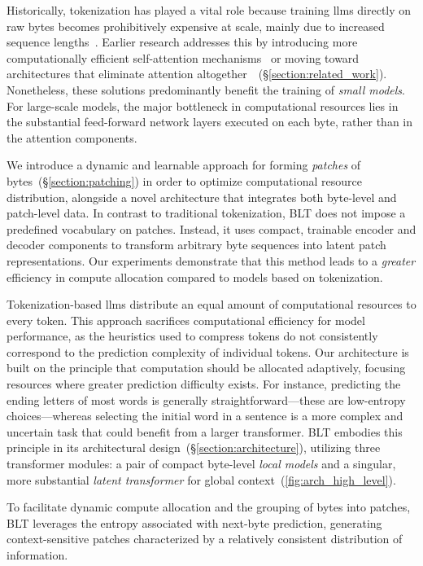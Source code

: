 Historically, tokenization has played a vital role because training llms directly on raw bytes becomes prohibitively expensive at scale, mainly due to increased sequence lengths~\citep{xue2022byt5}. Earlier research addresses this by introducing more computationally efficient self-attention mechanisms~\citep{el2020characterbert, clark2022canine} or moving toward architectures that eliminate attention altogether~\citep{wang2024mambabyte}~(\S\ref{section:related_work}). Nonetheless, these solutions predominantly benefit the training of \textit{small models}. For large-scale models, the major bottleneck in computational resources lies in the substantial feed-forward network layers executed on each byte, rather than in the attention components.

We introduce a dynamic and learnable approach for forming \textit{patches} of bytes~(\S\ref{section:patching}) in order to optimize computational resource distribution, alongside a novel architecture that integrates both byte-level and patch-level data. In contrast to traditional tokenization, {\textsc BLT} does not impose a predefined vocabulary on patches. Instead, it uses compact, trainable encoder and decoder components to transform arbitrary byte sequences into latent patch representations. Our experiments demonstrate that this method leads to a \textit{greater} efficiency in compute allocation compared to models based on tokenization.

Tokenization-based llms distribute an equal amount of computational resources to every token. This approach sacrifices computational efficiency for model performance, as the heuristics used to compress tokens do not consistently correspond to the prediction complexity of individual tokens. Our architecture is built on the principle that computation should be allocated adaptively, focusing resources where greater prediction difficulty exists. For instance, predicting the ending letters of most words is generally straightforward—these are low-entropy choices—whereas selecting the initial word in a sentence is a more complex and uncertain task that could benefit from a larger transformer. {\textsc BLT} embodies this principle in its architectural design~(\S\ref{section:architecture}), utilizing three transformer modules: a pair of compact byte-level \textit{local models} and a singular, more substantial \textit{latent transformer} for global context~(\autoref{fig:arch_high_level}).

To facilitate dynamic compute allocation and the grouping of bytes into patches, {\textsc BLT} leverages the entropy associated with next-byte prediction, generating context-sensitive patches characterized by a relatively consistent distribution of information.

